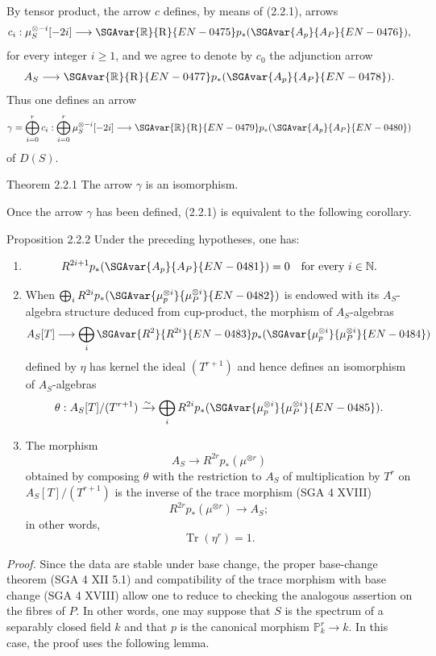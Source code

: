 By tensor product, the arrow $c$ defines, by means of (2.2.1), arrows
\[
c_i:\mu_S^{\otimes -i}[-2i]\longrightarrow \SGAvar{\mathbb{R}}{\mathrm{R}}{EN-0475}p_*(\SGAvar{A_p}{A_P}{EN-0476}),
\]
for every integer $i\ge1$, and we agree to denote by $c_0$ the adjunction arrow
\[
A_S\longrightarrow \SGAvar{\mathbb{R}}{\mathrm{R}}{EN-0477}p_*(\SGAvar{A_p}{A_P}{EN-0478}).
\]
Thus one defines an arrow
\[
\gamma=\bigoplus_{i=0}^{r}c_i:
\bigoplus_{i=0}^{r}\mu_S^{\otimes -i}[-2i]\longrightarrow \SGAvar{\mathbb{R}}{\mathrm{R}}{EN-0479}p_*(\SGAvar{A_p}{A_P}{EN-0480})
\]
of $D(S)$.

\begin{statement}{Theorem 2.2.1}
The arrow $\gamma$ is an isomorphism.
\end{statement}

Once the arrow $\gamma$ has been defined, (2.2.1) is equivalent to the following corollary.

\begin{statement}{Proposition 2.2.2}
Under the preceding hypotheses, one has:
\begin{enumerate}[label=\alph*)]
\item
\[
R^{2i+1}p_*(\SGAvar{A_p}{A_P}{EN-0481})=0\quad\text{for every }i\in\mathbb N.
\]
\item When $\bigoplus_i R^{2i}p_*(\SGAvar{\mu_p^{\otimes i}}{\mu_P^{\otimes i}}{EN-0482})$ is endowed with its $A_S$-algebra structure deduced from cup-product, the morphism of $A_S$-algebras
\[
A_S[T]\longrightarrow \bigoplus_i \SGAvar{R^{2}}{R^{2i}}{EN-0483}p_*(\SGAvar{\mu_p^{\otimes i}}{\mu_P^{\otimes i}}{EN-0484})
\]
defined by $\eta$ has kernel the ideal $(T^{r+1})$ and hence defines an isomorphism of $A_S$-algebras
\[
\theta:A_S[T]/(T^{r+1})\xrightarrow{\sim}\bigoplus_i R^{2i}p_*(\SGAvar{\mu_p^{\otimes i}}{\mu_P^{\otimes i}}{EN-0485}).
\]
\item The morphism
\[
A_S\longrightarrow R^{2r}p_*(\mu^{\otimes r})
\]
obtained by composing $\theta$ with the restriction to $A_S$ of multiplication by $T^r$ on $A_S[T]/(T^{r+1})$ is the inverse of the trace morphism (SGA 4 XVIII)
\[
R^{2r}p_*(\mu^{\otimes r})\longrightarrow A_S;
\]
in other words,
\[
\operatorname{Tr}(\eta^r)=1.
\]
\end{enumerate}
\end{statement}

\emph{Proof.} Since the data are stable under base change, the proper base-change theorem (SGA 4 XII 5.1) and compatibility of the trace morphism with base change (SGA 4 XVIII) allow one to reduce to checking the analogous assertion on the fibres of $P$. In other words, one may suppose that $S$ is the spectrum of a separably closed field $k$ and that $p$ is the canonical morphism $\mathbb P^r_k\to k$. In this case, the proof uses the following lemma.

